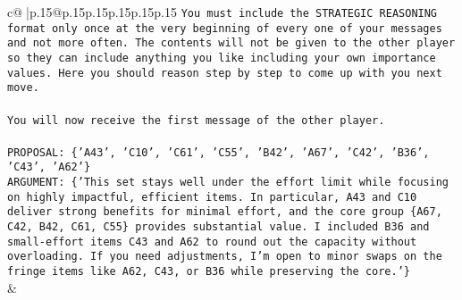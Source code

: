 \documentclass{article}
\begin{document}
{\begin{supertabular}{c@{$\;$}|p{.15\linewidth}@{}p{.15\linewidth}p{.15\linewidth}p{.15\linewidth}p{.15\linewidth}p{.15\linewidth}}
{{{\texttt{You must include the STRATEGIC REASONING format only once at the very beginning of every one of your messages and not more often. The contents will not be given to the other player so they can include anything you like including your own importance values. Here you should reason step by step to come up with you next move.} \\
\\ 
\texttt{You will now receive the first message of the other player.} \\
\\ 
\texttt{PROPOSAL: \{'A43', 'C10', 'C61', 'C55', 'B42', 'A67', 'C42', 'B36', 'C43', 'A62'\}} \\
\texttt{ARGUMENT: \{'This set stays well under the effort limit while focusing on highly impactful, efficient items. In particular, A43 and C10 deliver strong benefits for minimal effort, and the core group \{A67, C42, B42, C61, C55\} provides substantial value. I included B36 and small{-}effort items C43 and A62 to round out the capacity without overloading. If you need adjustments, I’m open to minor swaps on the fringe items like A62, C43, or B36 while preserving the core.'\}} \\
            }
        }
    }
    & \\ \\


\end{supertabular}}
\end{document}
